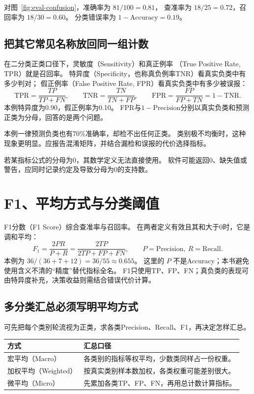 对图~\ref{fig:eval-confusion}，准确率为 $81/100=0.81$，
查准率为 $18/25=0.72$，召回率为 $18/30=0.60$。
分类错误率为 $1-\mathrm{Accuracy}=0.19$。

\subsection{把其它常见名称放回同一组计数}
在二分类正类口径下，灵敏度（Sensitivity）和真正例率
（True Positive Rate, TPR）就是召回率。
特异度（Specificity，也称真负例率TNR）看真实负类中有多少判对；
假正例率（False Positive Rate, FPR）看真实负类中有多少被误报：
\[
 \mathrm{TPR}=\frac{TP}{TP+FN},\qquad
 \mathrm{TNR}=\frac{TN}{TN+FP},\qquad
 \mathrm{FPR}=\frac{FP}{FP+TN}=1-\mathrm{TNR}.
\]
本例特异度为0.90，假正例率为0.10。
FPR与$1-\mathrm{Precision}$分别以真实负类和预测正类为分母，回答的是两个问题。

\begin{keyidea}[类别比例与准确率基线]
本例一律预测负类也有70\%准确率，却检不出任何正类。
类别极不均衡时，这种现象更明显。应报告混淆矩阵，并结合漏检和误报的代价选择指标。
\end{keyidea}

若某指标公式的分母为0，其数学定义无法直接使用。
软件可能返回0、缺失值或警告，应同时记录约定及导致分母为0的支持数。

\section{F1、平均方式与分类阈值}
\label{sec:eval-f1}

F1分数（F1 Score）综合查准率与召回率。
在两者定义有效且其和大于0时，它是调和平均：
\[
 F_1=\frac{2PR}{P+R}
     =\frac{2TP}{2TP+FP+FN},\qquad
 P=\mathrm{Precision},\ R=\mathrm{Recall}.
\]
本例为 $36/(36+7+12)=36/55\approx0.655$。
这里的 $P$ 不是Accuracy；本书避免使用含义不清的“精度”替代指标全名。
F1只使用TP、FP、FN；真负类的表现可由特异度补充，决策收益则需结合错误代价计算。

\subsection{多分类汇总必须写明平均方式}
可先把每个类别轮流视为正类，求各类Precision、Recall、F1，再决定怎样汇总。

\begin{center}
\small
\renewcommand{\arraystretch}{1.4}
\begin{tabularx}{\textwidth}{P{28mm}Y}
\toprule
方式 & 汇总口径\\
\midrule
宏平均（Macro） & 各类别的指标等权平均，少数类同样占一份权重。\\
加权平均（Weighted） & 按真实类别样本数加权，各类权重可能差别很大。\\
微平均（Micro） & 先累加各类TP、FP、FN，再用总计数计算指标。\\
\bottomrule
\end{tabularx}
\end{center}

